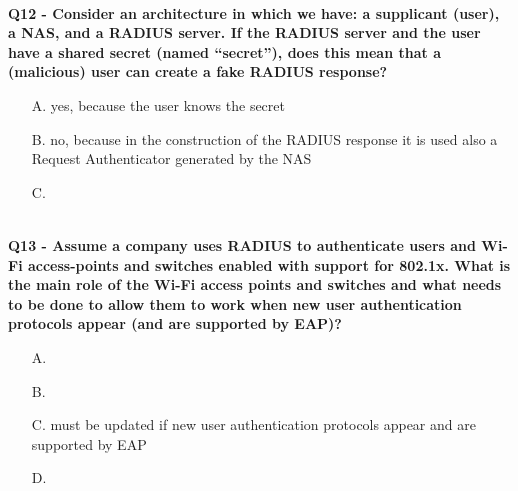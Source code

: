 \textbf{\\Q12 - Consider an architecture in which we have: a supplicant (user), a NAS, and a RADIUS server. If the
RADIUS server and the user have a shared secret (named “secret”), does this mean that a (malicious) user can create
a fake RADIUS response?}
\begin{itemize}
    \item[A.] yes, because the user knows the secret
    \item[B.] no, because in the construction of the RADIUS response it is used also a Request Authenticator generated by the NAS
    \item[C.] 
\end{itemize}

\textbf{\\Q13 - Assume a company uses RADIUS to authenticate users and Wi-Fi access-points and switches enabled with support
for 802.1x. What is the main role of the Wi-Fi access points and switches and what needs to be done to allow them to
work when new user authentication protocols appear (and are supported by EAP)?}
\begin{itemize}
    \item[A.] 
    \item[B.] 
    \item[C.] must be updated if new user authentication protocols appear and are supported by EAP
    \item[D.] 
\end{itemize}


